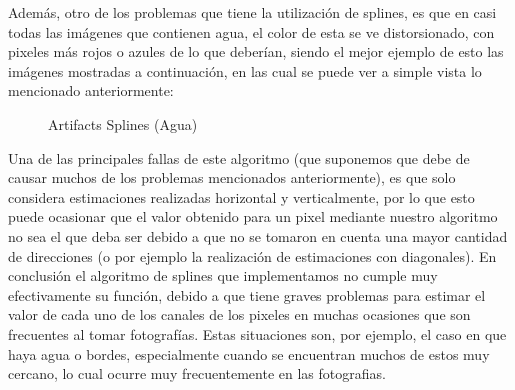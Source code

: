 \documentclass[10pt, a4paper]{article}
\begin{document}
Adem\'as, otro de los problemas que tiene la utilizaci\'on de splines, es que en casi todas las im\'agenes que contienen agua, el color de esta se ve distorsionado, con pixeles m\'as rojos o azules de lo que deber\'ian, siendo el mejor ejemplo de esto las im\'agenes mostradas a continuaci\'on, en las cual se puede ver a simple vista lo mencionado anteriormente:
\begin{figure}[H]
\centering
	\caption{Artifacts Splines (Agua)} 
\end{figure}
Una de las principales fallas de este algoritmo (que suponemos que debe de causar muchos de los problemas mencionados anteriormente), es que solo considera estimaciones realizadas horizontal y verticalmente, por lo que esto puede ocasionar que el valor obtenido para un pixel mediante nuestro algoritmo no sea el que deba ser debido a que no se tomaron en cuenta una mayor cantidad de direcciones (o por ejemplo la realizaci\'on de estimaciones con diagonales).
En conclusi\'on el algoritmo de splines que implementamos no cumple muy efectivamente su funci\'on, debido a que tiene graves problemas para estimar el valor de cada uno de los canales de los pixeles en muchas ocasiones que son frecuentes al tomar fotograf\'ias. Estas situaciones son, por ejemplo, el caso en que haya agua o bordes, especialmente cuando se encuentran muchos de estos muy cercano, lo cual ocurre muy frecuentemente en las fotografias.
\end{document}
